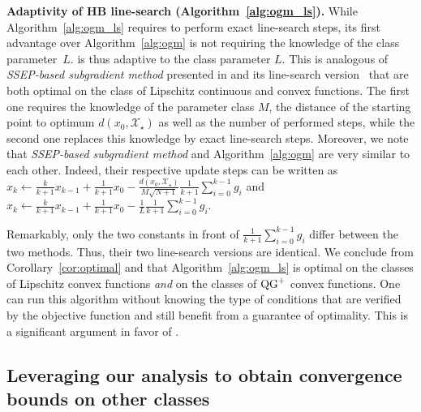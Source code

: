         \textbf{Adaptivity of HB line-search (Algorithm~\ref{alg:ogm_ls}).}
        While Algorithm~\ref{alg:ogm_ls} requires to perform exact line-search steps, its first advantage over Algorithm~\ref{alg:ogm} is not requiring the knowledge of the class parameter~$L$.  is thus  adaptive to the class parameter $L$.
        This is analogous of \emph{SSEP-based subgradient method} presented in \citet[Corollary 3]{drori2020efficient} and its line-search version~\citep[See][Corollary 4]{drori2020efficient} that are both optimal on the class of Lipschitz continuous and convex functions.
        The first one requires the knowledge of the parameter class $M$, the distance of the starting point to optimum $d(x_0, \mathcal{X}_\star)$ as well as the number of performed steps, while the second one replaces this knowledge by exact line-search steps.
        Moreover, we note that \emph{SSEP-based subgradient method} and Algorithm~\ref{alg:ogm} are very similar to each other.
        Indeed, their respective update steps can be written as
        $x_k \gets \frac{k}{k+1}x_{k-1} + \frac{1}{k+1}x_0 - \frac{d(x_0, \mathcal{X}_\star)}{M\sqrt{N+1}} \frac{1}{k+1}\sum_{i=0}^{k-1} g_i$
        and $x_k \gets \frac{k}{k+1}x_{k-1} + \frac{1}{k+1}x_0 - \frac{1}{L}\frac{1}{k+1}\sum_{i=0}^{k-1} g_i.$

        Remarkably, only the two constants in front of $\frac{1}{k+1}\sum_{i=0}^{k-1} g_i$ differ between the  two methods.
        Thus, their two line-search versions are identical.
        We conclude from Corollary~\ref{cor:optimal} and \citet[Corollary 4]{drori2020efficient} that Algorithm~\ref{alg:ogm_ls} is optimal on the classes of Lipschitz convex functions \emph{and} on the classes of $\operatorname{QG}^+$ convex functions.
        One can run this algorithm without knowing the type of conditions that are verified by the objective function and still benefit from a guarantee of optimality.
        This is a significant argument in favor of .


    \subsection{Leveraging our analysis to obtain convergence bounds on other classes}
    \label{subsec:leveraging-our-analysis-to-obtain-convergence-bounds-on-other-classes}
    
